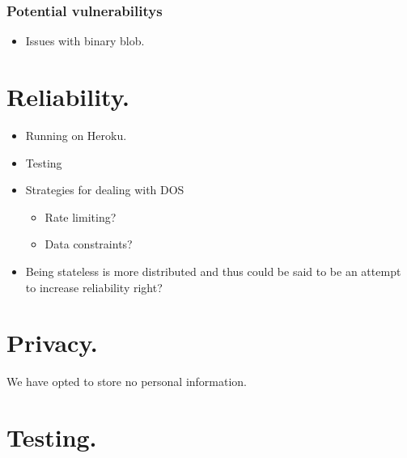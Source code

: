 \documentclass[10pt,a4paper]{article}
\begin{document}
\subsubsection*{Potential vulnerabilitys}
\begin{itemize}
\item Issues with binary blob.
\end{itemize}

\newpage
\section*{Reliability.}
\begin{itemize}
\item Running on Heroku.
\item Testing
\item Strategies for dealing with DOS 
\begin{itemize}
\item Rate limiting?
\item Data constraints?
\end{itemize}
\item Being stateless is more distributed and thus could be said to be an attempt to increase reliability right?
\end{itemize}
\newpage 
\section*{Privacy.}
We have opted to store no personal information.
\newpage
\section*{Testing.}
\end{document}

